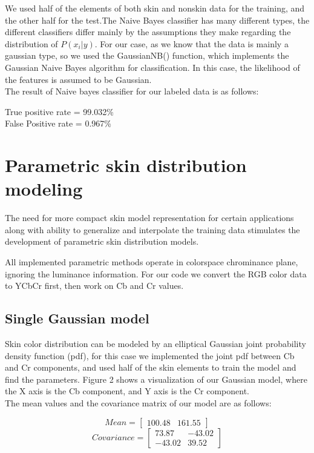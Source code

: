 \documentclass[12pt]{article} %
\begin{document}
We used half of the elements of both skin and nonskin data for the training, and the other half for the test.The Naive Bayes classifier has many different types, the different classifiers differ mainly by the assumptions they make regarding the distribution of $P(x_i| y)$. For our case, as we know that the data is mainly a gaussian type, so we used the GaussianNB() function, which implements the Gaussian Naive Bayes algorithm for classification. In this case, the likelihood of the features is assumed to be Gaussian. \\

The result of Naive bayes classifier for our labeled data is as follows:


\begin{center}
True positive rate = 99.032\% \\
False Positive rate = 0.967\%
\end{center}



\section{Parametric skin distribution modeling} %

The need for more compact skin model representation for certain applications along with ability to generalize and interpolate the training data stimulates the development of parametric skin distribution models.

All implemented parametric methods operate in colorspace chrominance plane, ignoring the luminance information. For our code we convert the RGB color data to YCbCr first, then work on Cb and Cr values. 


\subsection{Single Gaussian model } 

Skin color distribution can be modeled by an elliptical Gaussian
joint probability density function (pdf), for this case we implemented the joint pdf between Cb and Cr components, and used half of the skin elements to train the model and find the parameters. Figure 2 shows a visualization of our Gaussian model, where the X axis is the Cb component, and Y axis is the Cr component. \\

The mean values and the covariance matrix of our model are as follows:

$$
Mean =  \begin{bmatrix}
  100.48 & 161.55
 \end{bmatrix}
$$
$$
Covariance =  \begin{bmatrix}
  73.87 & -43.02 \\
  -43.02 & 39.52 
 \end{bmatrix}
$$
\end{document}
